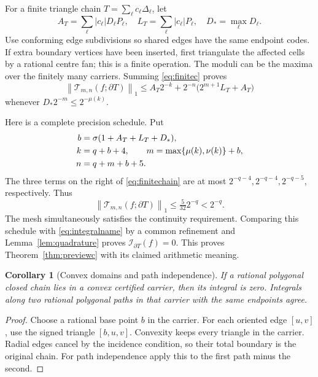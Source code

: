 \documentclass[11pt]{article}
\newtheorem{corollary}[theorem]{Corollary}
\theoremstyle{definition}
\newcommand{\norm}[1]{\left\lVert#1\right\rVert_1}
\newcommand{\trap}{\mathcal T}
\newcommand{\Int}{\mathcal I}
\newcommand{\bd}{\partial}
\begin{document}
For a finite triangle chain \(T=\sum_\ell c_\ell\Delta_\ell\), let
\begin{equation}\label{eq:chainbudgets}
 A_T=\sum_\ell|c_\ell|D_\ell P_\ell,\quad
 L_T=\sum_\ell|c_\ell|P_\ell,\quad
 D_* =\max_\ell D_\ell.
\end{equation}
Use conforming edge subdivisions so shared edges have the same endpoint
codes. If extra boundary vertices have been inserted, first triangulate
the affected cells by a rational centre fan; this is a finite operation.
The moduli can be the maxima over the finitely many carriers.
Summing \eqref{eq:finitec} proves
\begin{equation}\label{eq:finitechain}
 \norm{\trap_{m,n}(f;\bd T)}
 \le A_T2^{-k}+2^{-n}\bigl(2^{m+1}L_T+A_T\bigr)
\end{equation}
whenever \(D_*2^{-m}\le2^{-\mu(k)}\).

Here is a complete precision schedule. Put
\begin{align}
 b&=\sigma(1+A_T+L_T+D_*),\notag\\
 k&=q+b+4,\qquad m=\max\{\mu(k),\nu(k)\}+b,\notag\\
 n&=q+m+b+5.\label{eq:cauchyschedule}
\end{align}
The three terms on the right of \eqref{eq:finitechain} are at most
\(2^{-q-4},2^{-q-4},2^{-q-5}\), respectively. Thus
\begin{equation}\label{eq:cauchyoutput}
 \norm{\trap_{m,n}(f;\bd T)}\le\tfrac5{32}2^{-q}<2^{-q}.
\end{equation}
The mesh simultaneously satisfies the continuity requirement. Comparing
this schedule with \eqref{eq:integralname} by a common refinement and
Lemma~\ref{lem:quadrature} proves \(\Int_{\bd T}(f)=0\).
This proves Theorem~\ref{thm:previewc} with its claimed arithmetic meaning.

\begin{corollary}[Convex domains and path independence]\label{cor:convex}
If a rational polygonal closed chain lies in a convex certified carrier,
then its integral is zero. Integrals along two rational polygonal paths
in that carrier with the same endpoints agree.
\end{corollary}
\begin{proof}
Choose a rational base point \(b\) in the carrier. For each oriented edge
\([u,v]\), use the signed triangle \([b,u,v]\). Convexity keeps every
triangle in the carrier. Radial edges cancel by the incidence condition,
so their total boundary is the original chain. For path independence
apply this to the first path minus the second.
\end{proof}
\end{document}
